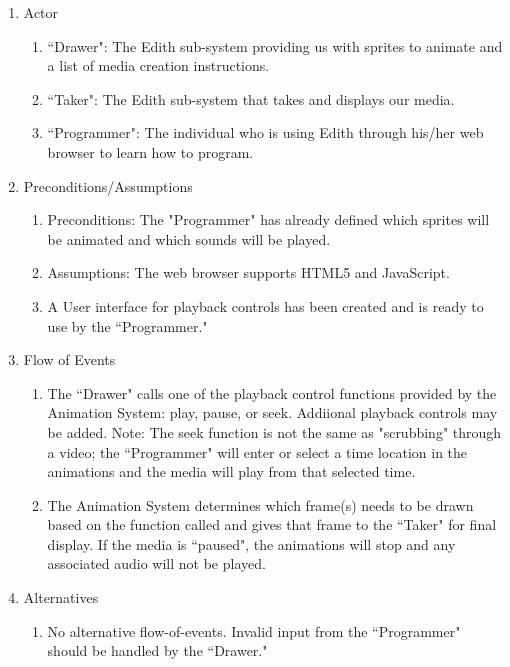 \documentclass[12pt]{article}
\begin{document}
\begin{enumerate}
  \item Actor
  \begin{enumerate}
      \item ``Drawer": The Edith sub-system providing us with sprites to animate and a list of media creation instructions.
       \item ``Taker": The Edith sub-system that takes and displays our media.
       \item ``Programmer": The individual who is using Edith through his/her web browser to learn how to program.
  \end{enumerate}
  \item Preconditions/Assumptions
  \begin{enumerate}
       \item Preconditions: The "Programmer" has already defined which sprites will be animated and which sounds will be played.
       \item Assumptions: The web browser supports HTML5 and JavaScript.
       \item A User interface for playback controls has been created and is ready to use by the ``Programmer."
  \end{enumerate}
  \item Flow of Events
  \begin{enumerate}
      \item The ``Drawer" calls one of the playback control functions provided by the Animation System: play, pause, or seek. Addiional playback controls may be added. Note: The seek function is not the same as "scrubbing" through a video; the ``Programmer" will enter or select a time location in the animations and the media will play from that selected time.
      \item The Animation System determines which frame(s) needs to be drawn based on the function called and gives that frame to the ``Taker" for final display. If the media is ``paused", the animations will stop and any associated audio will not be played.
  \end{enumerate}
  \item Alternatives
  \begin{enumerate}
        \item No alternative flow-of-events. Invalid input from the ``Programmer" should be handled by the ``Drawer."
  \end{enumerate}
\end{enumerate}
	
\end{document}
